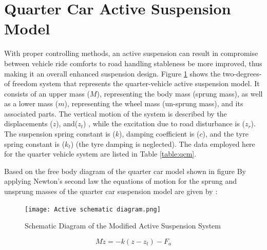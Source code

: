 \section{Quarter Car Active Suspension Model}
With proper controlling methods, an active suspension can result in compromise
between vehicle ride comforts to road handling stableness be more improved, thus making
it an overall enhanced suspension design\cite{riduan2018review}.
Figure \ref{fig:Active schematic diagram} shows the two-degrees-of
freedom system that represents the quarter-vehicle active 
suspension model. It consists of an upper mass ($M$), 
representing the body mass (sprung mass), as well as a 
lower mass ($m$), representing the wheel mass (un-sprung 
mass), and its associated parts. The vertical motion of the 
system is described by the displacements ($z$), and($z_t$) , 
while the excitation due to road disturbance is ($z_r$). The 
suspension spring constant is ($k$), damping coefficient is 
($c$), and the tyre spring constant is ($k_t$) (the tyre damping is 
neglected). The data employed here for the quarter
vehicle system are listed in Table \ref{table:qcm}. 

Based on the free body diagram of the quarter car model shown in figure 
By applying Newton’s second law the equations of 
motion for the sprung and unsprung masses of the quarter
car suspension model are given by \cite{chiou2009using}:
\begin{figure}[H]
	\centering
	\texttt{[image: Active schematic diagram.png]}
	\caption{Schematic Diagram of the Modified Active Suspension System \cite{wong2001theory}}
	\label{fig:Active schematic diagram}
	
\end{figure}
\begin{equation}
	M\ddot{z} = -k(z - z_t) - F_a
	\label{eqn:4.2}
\end{equation}

